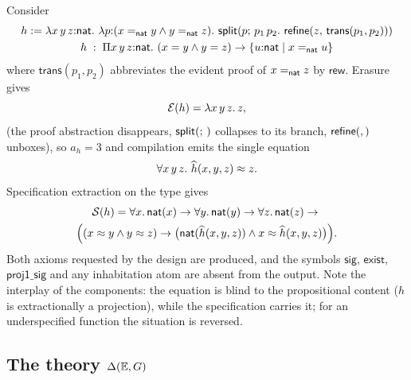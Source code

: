 \begin{example}
\label{ex:h}
Consider
\begin{gather*}
  h \mathrel{:=} \lambda x\,y\,z{:}\mathsf{nat}.\ \lambda p{:}(x =_{\mathsf{nat}} y \wedge y
  =_{\mathsf{nat}} z).\ \mathsf{split}(p;\,p_1\,p_2.\ \mathsf{refine}(z,\,\mathsf{trans}(p_1,
  p_2)))\\
  h \;:\; \Pi x\,y\,z{:}\mathsf{nat}.\ (x = y \wedge y = z) \to
  \{u{:}\mathsf{nat} \mid x =_{\mathsf{nat}} u\}
\end{gather*}
where $\mathsf{trans}(p_1,p_2)$ abbreviates the evident proof of
$x =_{\mathsf{nat}} z$ by $\mathsf{rew}$.  Erasure gives
\[
  \mathcal{E}(h) = \lambda x\,y\,z.\,z,
\]
(the proof abstraction disappears, $\mathsf{split}(;\,)$ collapses to its branch,
$\mathsf{refine}(,)$ unboxes), so $a_h = 3$ and compilation emits the single
equation
\[
  \forall x\,y\,z.\ \widehat{h}(x, y, z) \approx z.
\]
Specification extraction on the type gives
\begin{multline*}
  \mathcal{S}(h) =
  \forall x.\,\mathsf{nat}(x) \to \forall y.\,\mathsf{nat}(y) \to \forall z.\,\mathsf{nat}(z)
  \to{}\\
  \Bigl( (x \approx y \wedge y \approx z) \to
    \bigl( \mathsf{nat}(\widehat{h}(x,y,z)) \wedge x \approx \widehat{h}(x,y,z) \bigr)
  \Bigr).
\end{multline*}
Both axioms requested by the design are produced, and the symbols
$\mathsf{sig}$, $\mathsf{exist}$, $\mathsf{proj1\_sig}$ and any
inhabitation atom are absent from the output.  Note the interplay of the
components: the equation is blind to the propositional content ($h$ is
extractionally a projection), while the specification carries it; for an
underspecified function the situation is reversed.
\end{example}

\subsection{The theory \texorpdfstring{$\Delta(\mathbb{E},G)$}{Delta(E,G)}}
\label{sec:translation-theory}

